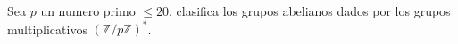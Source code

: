 \question
Sea $p$ un numero primo $\le 20$, clasifica los grupos abelianos dados por 
los grupos multiplicativos $(\mathbb{Z}/p\mathbb{Z})^*$.